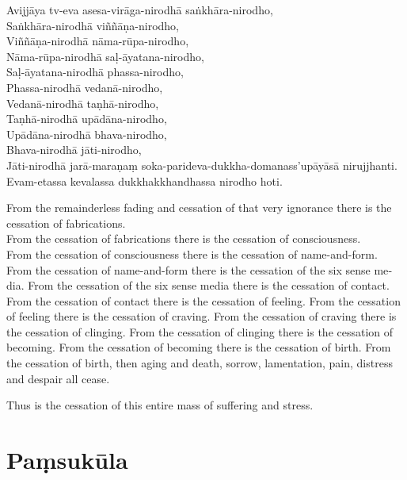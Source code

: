 Avijjāya tv-eva asesa-virāga-nirodhā saṅkhāra-nirodho,\\
Saṅkhāra-nirodhā viññāṇa-nirodho,\\
Viññāṇa-nirodhā nāma-rūpa-nirodho,\\
Nāma-rūpa-nirodhā saḷ-āyatana-nirodho,\\
Saḷ-āyatana-nirodhā phassa-nirodho,\\
Phassa-nirodhā vedanā-nirodho,\\
Vedanā-nirodhā taṇhā-nirodho,\\
Taṇhā-nirodhā upādāna-nirodho,\\
Upādāna-nirodhā bhava-nirodho,\\
Bhava-nirodhā jāti-nirodho,\\
Jāti-nirodhā jarā-maraṇaṃ soka-parideva-dukkha-domanass'upāyāsā nirujjhanti.\\
Evam-etassa kevalassa dukkhakkhandhassa nirodho hoti.

\begin{english}
  From the remainderless fading and cessation of that very ignorance there is the
  cessation of fabrications.\\
From the cessation of fabrications there is the cessation of consciousness.\\
From the cessation of consciousness there is the cessation of name-and-form.
From the cessation of name-and-form there is the cessation of the six sense media.
From the cessation of the six sense media there is the cessation of contact.
From the cessation of contact there is the cessation of feeling.
From the cessation of feeling there is the cessation of craving.
From the cessation of craving there is the cessation of clinging.
From the cessation of clinging there is the cessation of becoming.
From the cessation of becoming there is the cessation of birth.
From the cessation of birth, then aging and death, sorrow, lamentation, pain,
  distress and despair all cease.

Thus is the cessation of this entire mass of suffering and stress.
\end{english}


\clearpage

\section{Paṃsukūla}



